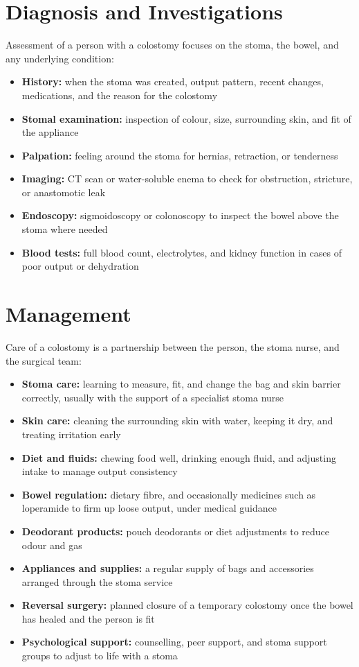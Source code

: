 \section*{Diagnosis and Investigations}
Assessment of a person with a colostomy focuses on the stoma, the bowel, and any underlying condition:

\begin{itemize}
    \item \textbf{History:} when the stoma was created, output pattern, recent changes, medications, and the reason for the colostomy
    \item \textbf{Stomal examination:} inspection of colour, size, surrounding skin, and fit of the appliance
    \item \textbf{Palpation:} feeling around the stoma for hernias, retraction, or tenderness
    \item \textbf{Imaging:} CT scan or water-soluble enema to check for obstruction, stricture, or anastomotic leak
    \item \textbf{Endoscopy:} sigmoidoscopy or colonoscopy to inspect the bowel above the stoma where needed
    \item \textbf{Blood tests:} full blood count, electrolytes, and kidney function in cases of poor output or dehydration
\end{itemize}

\section*{Management}
Care of a colostomy is a partnership between the person, the stoma nurse, and the surgical team:

\begin{itemize}
    \item \textbf{Stoma care:} learning to measure, fit, and change the bag and skin barrier correctly, usually with the support of a specialist stoma nurse
    \item \textbf{Skin care:} cleaning the surrounding skin with water, keeping it dry, and treating irritation early
    \item \textbf{Diet and fluids:} chewing food well, drinking enough fluid, and adjusting intake to manage output consistency
    \item \textbf{Bowel regulation:} dietary fibre, and occasionally medicines such as loperamide to firm up loose output, under medical guidance
    \item \textbf{Deodorant products:} pouch deodorants or diet adjustments to reduce odour and gas
    \item \textbf{Appliances and supplies:} a regular supply of bags and accessories arranged through the stoma service
    \item \textbf{Reversal surgery:} planned closure of a temporary colostomy once the bowel has healed and the person is fit
    \item \textbf{Psychological support:} counselling, peer support, and stoma support groups to adjust to life with a stoma
\end{itemize}

